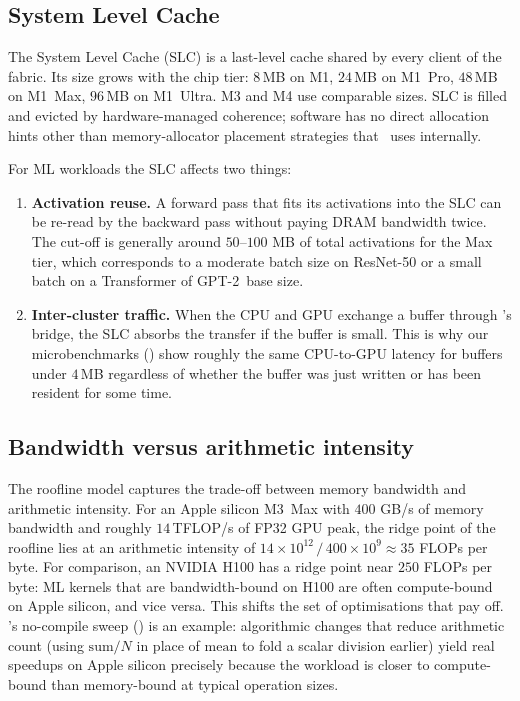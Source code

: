 \subsection{System Level Cache}
\label{ssec:apple_silicon:memory_slc}

The System Level Cache (SLC) is a last-level cache shared by every
client of the fabric. Its size grows with the chip tier:
$8$\,MB on M1, $24$\,MB on M1~Pro, $48$\,MB on M1~Max, $96$\,MB on
M1~Ultra. M3 and M4 use comparable sizes. SLC is filled and evicted
by hardware-managed coherence; software has no direct allocation
hints other than memory-allocator placement strategies that
\Accelerate\ uses internally.

For ML workloads the SLC affects two things:
\begin{enumerate}
  \item \textbf{Activation reuse.} A forward pass that fits its
    activations into the SLC can be re-read by the backward pass
    without paying DRAM bandwidth twice. The cut-off is generally
    around $50$--$100$ MB of total activations for the Max tier,
    which corresponds to a moderate batch size on ResNet-50 or a
    small batch on a Transformer of GPT-2~base size.
  \item \textbf{Inter-cluster traffic.} When the CPU and GPU exchange
    a buffer through \Lucid's bridge, the SLC absorbs the transfer
    if the buffer is small. This is why our microbenchmarks
    () show roughly the same CPU-to-GPU
    latency for buffers under $4$\,MB regardless of whether the
    buffer was just written or has been resident for some time.
\end{enumerate}

\subsection{Bandwidth versus arithmetic intensity}
\label{ssec:apple_silicon:memory_intensity}

The roofline model captures the trade-off between memory bandwidth
and arithmetic intensity. For an Apple silicon M3~Max with $400$
GB/s of memory bandwidth and roughly $14$\,TFLOP/s of FP32 GPU peak,
the ridge point of the roofline lies at an arithmetic intensity of
$14 \times 10^{12} \,/\, 400 \times 10^9 \approx 35$ FLOPs per byte.
For comparison, an NVIDIA H100 has a ridge point near $250$ FLOPs
per byte: ML kernels that are bandwidth-bound on H100 are often
compute-bound on Apple silicon, and vice versa. This shifts the set
of optimisations that pay off. \Lucid's no-compile sweep
() is an example: algorithmic changes
that reduce arithmetic count (using $\mathrm{sum} / N$ in place of
$\mathrm{mean}$ to fold a scalar division earlier) yield real
speedups on Apple silicon precisely because the workload is closer
to compute-bound than memory-bound at typical operation sizes.

